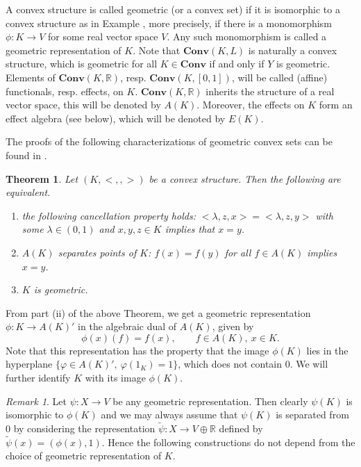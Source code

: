 \documentclass[12pt]{article}
\newtheorem{thm}{Theorem}
\newcommand{\<}{\langle}
\theoremstyle{remark}
\newtheorem{rem}{Remark}
\newcommand{\ct}[1]{\mathbf{#1}}
\begin{document}
A convex structure is called geometric (or a convex set) if it is isomorphic to a convex structure as in Example \cite{ex:geomeric}, more precisely, if there is a 
monomorphism $\phi:K\to V$ for some real vector space $V$. Any such monomorphism is called a geometric representation of $K$. Note that $\ct{Conv}(K,L)$ is naturally a convex structure, which is geometric for all $K\in \ct{Conv}$ if and only if $Y$ is geometric. Elements of $\ct{Conv}(K,\mathbb R)$, resp. $\ct{Conv}(K,[0,1])$, will be called (affine) functionals, resp. effects, on $K$. 
$\ct{Conv}(K,\mathbb R)$ inherits the structure of a real vector space, this will be denoted by $A(K)$. Moreover, the effects on $K$ form an effect algebra (see below), which will be denoted by $E(K)$.
 
The proofs of the following characterizations of geometric convex sets can be found in \cite{stone,gudder,fritz}.

\begin{thm} Let $(K,<,,>)$ be a convex structure. Then the following are equivalent.
\begin{enumerate}
\item[(i)] the following cancellation property holds: $<\lambda,z,x>=<\lambda,z,y>$ with some $\lambda \in (0,1)$ and  $x,y,z\in K$  implies that $x=y$.
\item[(ii)] $A(K)$ separates points of $K$: $f(x)=f(y)$ for all $f\in A(K)$ implies $x=y$.
\item[(iii)] $K$ is geometric.
\end{enumerate}


\end{thm}

From part (ii) of the above Theorem, we get a geometric representation $\phi: K\to A(K)'$ in the algebraic dual of $A(K)$, given by
\[
\phi(x)(f)=f(x),\qquad f\in A(K),\ x\in K.
\]
Note that this representation has the property that the image $\phi(K)$  lies in the hyperplane $\{ \varphi\in A(K)',\ \varphi(1_K)=1\}$, which does not contain 0. 
We will further identify $K$ with its image $\phi(K)$. 

 \begin{rem} Let $\psi:X\to V$ be  any geometric representation. Then clearly $\psi(K)$ is isomorphic to $\phi(K)$ and we may always assume that $\psi(K)$ is separated from 0 by considering the representation  $\tilde \psi:X\to V\oplus \mathbb R$  defined by $\tilde \psi(x)=(\phi(x),1)$. Hence the following constructions do not depend from the choice of geometric representation of $K$.

\end{rem}
\end{document}
